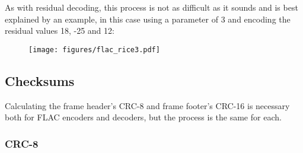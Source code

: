 As with residual decoding, this process is not as difficult as it
sounds and is best explained by an example, in this case using
a parameter of 3 and encoding the residual values 18, -25 and 12:
\begin{figure}[h]
\texttt{[image: figures/flac\_rice3.pdf]}
\end{figure}

\pagebreak

\subsection{Checksums}

Calculating the frame header's CRC-8 and frame footer's CRC-16 is necessary
both for FLAC encoders and decoders, but the process is the same for each.

\subsubsection{CRC-8}

